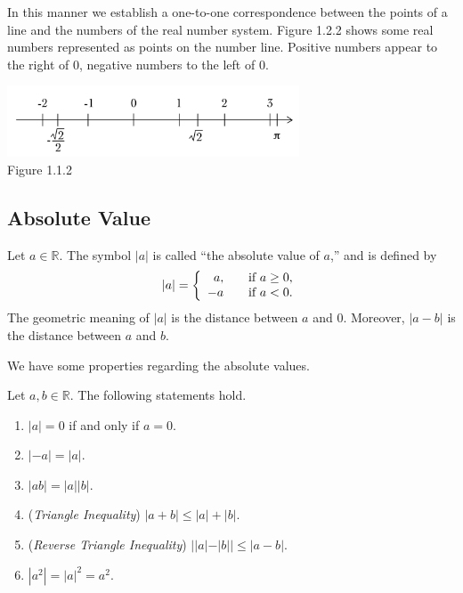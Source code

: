 \documentclass[11pt]{book}
\theoremstyle{break}
\theoremstyle{no_label}
\newcommand{\bbR}{\mathbb{R}}
\newcommand{\figtag}[1]{\\[-1.2em]Figure {#1}}
\numberwithin{equation}{section}
\begin{document}
In this manner we establish a one-to-one correspondence between the points of a line and the numbers of the real number system. Figure 1.2.2 shows some real numbers represented as points on the number line. Positive numbers appear to the right of $0$, negative numbers to the left of $0$.

\begin{center}
    \includegraphics[width=0.65\textwidth]{number_line_example.JPG}\figtag{1.1.2}
\end{center}

\subsection*{Absolute Value}

Let $a\in\bbR$. The symbol $|a|$ is called ``the absolute value of $a$,'' and is defined by \vspace*{0.5em} \begin{equation*}
    |a|=\left\{\begin{array}{rl}a,&\quad\text{if $a\geq0$,}\\-a&\quad\text{if $a<0$.}\end{array}\right.\\[0.5em]
\end{equation*} The geometric meaning of $|a|$ is the distance between $a$ and $0$. Moreover, $|a-b|$ is the distance between $a$ and $b$.

We have some properties regarding the absolute values. 

\begin{theorem}
    Let $a, b\in\bbR$. The following statements hold.
    \begin{enumerate}
        \item $|a|=0$ if and only if $a=0$.
        \item $|-a|=|a|$.
        \item $|ab|=|a||b|$.
        \item (\textit{Triangle Inequality}) $|a+b|\leq|a|+|b|$.
        \item (\textit{Reverse Triangle Inequality}) $||a|-|b||\leq|a-b|$.
        \item $|a^2|=|a|^2=a^2$.
    \end{enumerate}
\end{theorem}
\end{document}
